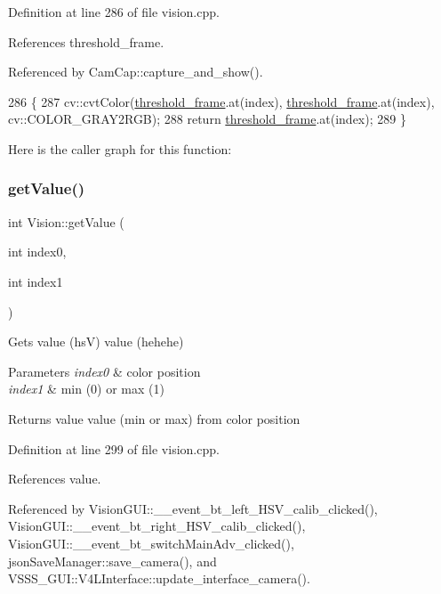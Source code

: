 Definition at line 286 of file vision.\+cpp.



References threshold\+\_\+frame.



Referenced by Cam\+Cap\+::capture\+\_\+and\+\_\+show().


\begin{DoxyCode}
286                                     \{
287     cv::cvtColor(\hyperlink{class_vision_a2fee2db2d4fe0cee6b2de36ee0eb6c7f}{threshold\_frame}.at(index), \hyperlink{class_vision_a2fee2db2d4fe0cee6b2de36ee0eb6c7f}{threshold\_frame}.at(index), 
      cv::COLOR\_GRAY2RGB);
288     \textcolor{keywordflow}{return} \hyperlink{class_vision_a2fee2db2d4fe0cee6b2de36ee0eb6c7f}{threshold\_frame}.at(index);
289 \}
\end{DoxyCode}
Here is the caller graph for this function\+:
\mbox{\label{class_vision_a04d1bcce0fd15a5d66752723f21c0dea}} 
\subsubsection{\texorpdfstring{get\+Value()}{getValue()}}
{\footnotesize\ttfamily int Vision\+::get\+Value (\begin{DoxyParamCaption}\item[{int}]{index0,  }\item[{int}]{index1 }\end{DoxyParamCaption})}

Gets value (hsV) value (hehehe) 
\begin{DoxyParams}{Parameters}
{\em index0} & color position \\
\hline
{\em index1} & min (0) or max (1) \\
\hline
\end{DoxyParams}
\begin{DoxyReturn}{Returns}
value value (min or max) from color position 
\end{DoxyReturn}


Definition at line 299 of file vision.\+cpp.



References value.



Referenced by Vision\+G\+U\+I\+::\+\_\+\+\_\+event\+\_\+bt\+\_\+left\+\_\+\+H\+S\+V\+\_\+calib\+\_\+clicked(), Vision\+G\+U\+I\+::\+\_\+\+\_\+event\+\_\+bt\+\_\+right\+\_\+\+H\+S\+V\+\_\+calib\+\_\+clicked(), Vision\+G\+U\+I\+::\+\_\+\+\_\+event\+\_\+bt\+\_\+switch\+Main\+Adv\+\_\+clicked(), json\+Save\+Manager\+::save\+\_\+camera(), and V\+S\+S\+S\+\_\+\+G\+U\+I\+::\+V4\+L\+Interface\+::update\+\_\+interface\+\_\+camera().


